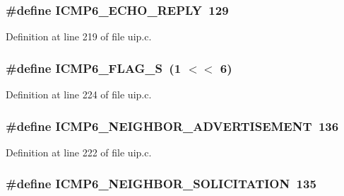 \hypertarget{group__uip_ga207d17b633cd095120a74bc1f2257b17}{
\subsubsection[{ICMP6\_\-ECHO\_\-REPLY}]{\setlength{\rightskip}{0pt plus 5cm}\#define ICMP6\_\-ECHO\_\-REPLY~129}}
\label{group__uip_ga207d17b633cd095120a74bc1f2257b17}


Definition at line 219 of file uip.c.

\hypertarget{group__uip_ga1d3211dbbdfb22d6a47b60dddcf945e8}{
\subsubsection[{ICMP6\_\-FLAG\_\-S}]{\setlength{\rightskip}{0pt plus 5cm}\#define ICMP6\_\-FLAG\_\-S~(1 $<$$<$ 6)}}
\label{group__uip_ga1d3211dbbdfb22d6a47b60dddcf945e8}


Definition at line 224 of file uip.c.

\hypertarget{group__uip_ga62c03e0a308cc23929a80fe8d8f9dc1e}{
\subsubsection[{ICMP6\_\-NEIGHBOR\_\-ADVERTISEMENT}]{\setlength{\rightskip}{0pt plus 5cm}\#define ICMP6\_\-NEIGHBOR\_\-ADVERTISEMENT~136}}
\label{group__uip_ga62c03e0a308cc23929a80fe8d8f9dc1e}


Definition at line 222 of file uip.c.

\hypertarget{group__uip_ga1cea57e3ea526f210b1068e6dcf7b4f4}{
\subsubsection[{ICMP6\_\-NEIGHBOR\_\-SOLICITATION}]{\setlength{\rightskip}{0pt plus 5cm}\#define ICMP6\_\-NEIGHBOR\_\-SOLICITATION~135}}
\label{group__uip_ga1cea57e3ea526f210b1068e6dcf7b4f4}


